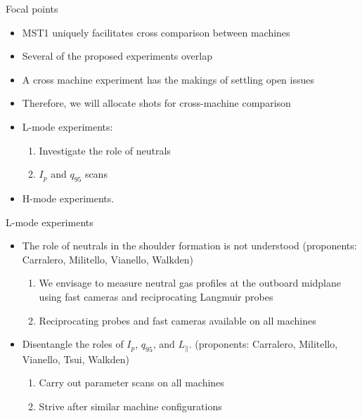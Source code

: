 \documentclass[10pt, compress]{beamer}
\begin{document}
\begin{frame}{Focal points}
\begin{itemize}
	\item MST1 uniquely facilitates cross comparison between machines
	\item Several of the proposed experiments overlap 
	\item A cross machine experiment has the makings of settling open issues
	\item Therefore, we will allocate shots for cross-machine comparison
	\item L-mode experiments: 
	\begin{enumerate}
		\item Investigate the role of neutrals 
		\item $I_p$ and $q_{95}$ scans
	\end{enumerate}
	\item H-mode experiments. 
\end{itemize}	
\end{frame}

\begin{frame}{L-mode experiments}
	\begin{itemize}
		\item The role of neutrals in the shoulder formation is not understood 		{\scriptsize(proponents: Carralero, Militello, Vianello, Walkden)}
		\begin{enumerate}
			\item We envisage to measure neutral gas profiles at the outboard 		midplane using fast cameras and reciprocating Langmuir probes
			\item Reciprocating probes and fast cameras available on all machines
		\end{enumerate}
		\item Disentangle the roles of $I_p$, $q_{95}$, and $L_{\|}$. {\scriptsize(proponents: Carralero, Militello, Vianello, Tsui, Walkden)}
		\begin{enumerate}
			\item Carry out parameter scans on all machines
			\item Strive after similar machine configurations
		\end{enumerate}
	\end{itemize}
\end{frame}
\end{document}
